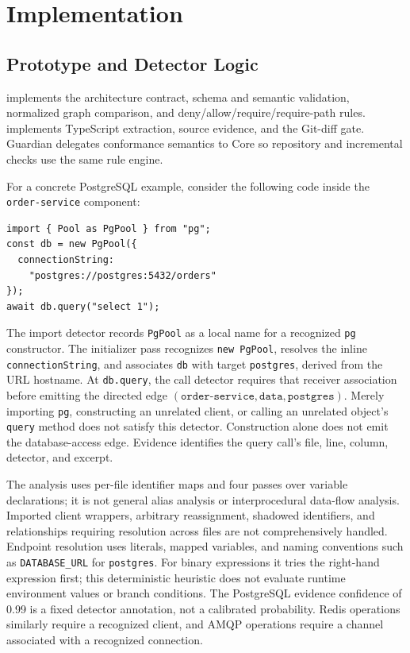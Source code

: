 \section{Implementation}

\subsection{Prototype and Detector Logic}

 implements the architecture contract, schema and semantic validation, normalized graph comparison, and deny/allow/require/require-path rules.  implements TypeScript extraction, source evidence, and the Git-diff gate. Guardian delegates conformance semantics to Core so repository and incremental checks use the same rule engine.

For a concrete PostgreSQL example, consider the following code inside the \texttt{order-service} component:
\begin{verbatim}
import { Pool as PgPool } from "pg";
const db = new PgPool({
  connectionString:
    "postgres://postgres:5432/orders"
});
await db.query("select 1");
\end{verbatim}
The import detector records \texttt{PgPool} as a local name for a recognized \texttt{pg} constructor. The initializer pass recognizes \texttt{new PgPool}, resolves the inline \texttt{connectionString}, and associates \texttt{db} with target \texttt{postgres}, derived from the URL hostname. At \texttt{db.query}, the call detector requires that receiver association before emitting the directed edge $(\texttt{order-service},\texttt{data},\texttt{postgres})$. Merely importing \texttt{pg}, constructing an unrelated client, or calling an unrelated object's \texttt{query} method does not satisfy this detector. Construction alone does not emit the database-access edge. Evidence identifies the query call's file, line, column, detector, and excerpt.

The analysis uses per-file identifier maps and four passes over variable declarations; it is not general alias analysis or interprocedural data-flow analysis. Imported client wrappers, arbitrary reassignment, shadowed identifiers, and relationships requiring resolution across files are not comprehensively handled. Endpoint resolution uses literals, mapped variables, and naming conventions such as \texttt{DATABASE\_URL} for \texttt{postgres}. For binary expressions it tries the right-hand expression first; this deterministic heuristic does not evaluate runtime environment values or branch conditions. The PostgreSQL evidence confidence of 0.99 is a fixed detector annotation, not a calibrated probability. Redis operations similarly require a recognized client, and AMQP operations require a channel associated with a recognized connection.

